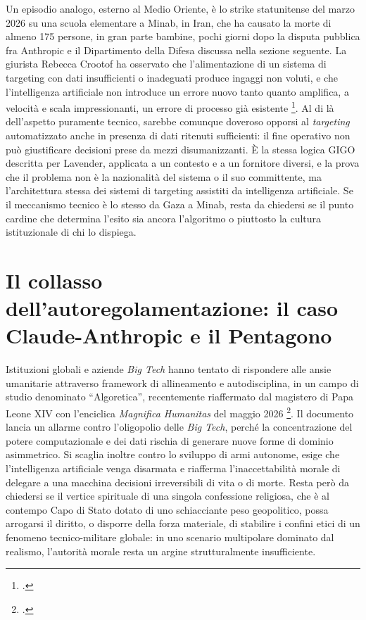 \documentclass[a4paper,12pt]{report}
\begin{document}
Un episodio analogo, esterno al Medio Oriente, è lo strike statunitense del marzo
2026 su una scuola elementare a Minab, in Iran, che ha causato la morte di almeno
175 persone, in gran parte bambine, pochi giorni dopo la disputa pubblica fra
Anthropic e il Dipartimento della Difesa discussa nella sezione seguente. La
giurista Rebecca Crootof ha osservato che l'alimentazione di un sistema di
targeting con dati insufficienti o inadeguati produce ingaggi non voluti, e che
l'intelligenza artificiale non introduce un errore nuovo tanto quanto amplifica,
a velocità e scala impressionanti, un errore di processo già esistente
\footcite{crootof_2026}. Al di là dell'aspetto puramente tecnico, sarebbe
comunque doveroso opporsi al \textit{targeting} automatizzato anche in presenza
di dati ritenuti sufficienti: il fine operativo non può giustificare decisioni
prese da mezzi disumanizzanti. È la stessa logica GIGO descritta per Lavender,
applicata a un contesto e a un fornitore diversi, e la prova che il problema non
è la nazionalità del sistema o il suo committente, ma l'architettura stessa dei
sistemi di targeting assistiti da intelligenza artificiale. Se il meccanismo
tecnico è lo stesso da Gaza a Minab, resta da chiedersi se il punto cardine che
determina l'esito sia ancora l'algoritmo o piuttosto la cultura istituzionale di
chi lo dispiega.

\section{Il collasso dell'autoregolamentazione: il caso Claude-Anthropic e il Pentagono}

Istituzioni globali e aziende \textit{Big Tech} hanno tentato di rispondere alle
ansie umanitarie attraverso framework di allineamento e autodisciplina, in un
campo di studio denominato ``Algoretica'', recentemente riaffermato dal magistero
di Papa Leone XIV con l'enciclica \textit{Magnifica Humanitas} del maggio 2026
\footcite{enciclica_2026}. Il documento lancia un allarme contro l'oligopolio
delle \textit{Big Tech}, perché la concentrazione del potere computazionale e dei
dati rischia di generare nuove forme di dominio asimmetrico. Si scaglia inoltre
contro lo sviluppo di armi autonome, esige che l'intelligenza artificiale venga
disarmata e riafferma l'inaccettabilità morale di delegare a una macchina
decisioni irreversibili di vita o di morte. Resta però da chiedersi se il vertice
spirituale di una singola confessione religiosa, che è al contempo Capo di Stato
dotato di uno schiacciante peso geopolitico, possa arrogarsi il diritto, o
disporre della forza materiale, di stabilire i confini etici di un fenomeno
tecnico-militare globale: in uno scenario multipolare dominato dal realismo,
l'autorità morale resta un argine strutturalmente insufficiente.
\end{document}
